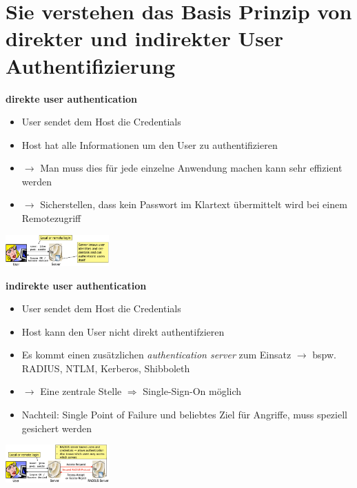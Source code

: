 \documentclass{report}
\newenvironment{Figure}
	{\par\medskip\noindent\minipage{\linewidth}}
	{\endminipage\par\medskip}
\theoremstyle{definition}
\theoremstyle{example}
\begin{document}
\section{Sie verstehen das Basis Prinzip von direkter und indirekter User Authentifizierung}
\textbf{direkte user authentication}
\begin{itemize}
	\item User sendet dem Host die Credentials
	\item Host hat alle Informationen um den User zu authentifizieren
	\item $\rightarrow$ Man muss dies für jede einzelne Anwendung machen kann sehr effizient werden
	\item $\rightarrow$ Sicherstellen, dass kein Passwort im Klartext übermittelt wird bei einem Remotezugriff
\end{itemize}

\begin{Figure}
\centering
\includegraphics[width=150px]{img/directUserAuthentication.png}
	\label{fig:Abbildung der Terminologien}
\end{Figure}

\textbf{indirekte user authentication}
\begin{itemize}
	\item User sendet dem Host die Credentials
	\item Host kann den User nicht direkt authentifzieren
	\item Es kommt einen zusätzlichen \textit{authentication server} zum Einsatz $\rightarrow$ bspw. RADIUS, NTLM, Kerberos, Shibboleth
	\item $\rightarrow$ Eine zentrale Stelle $\Rightarrow$ Single-Sign-On möglich
	\item Nachteil: Single Point of Failure und beliebtes Ziel für Angriffe, muss speziell gesichert werden
\end{itemize}

\begin{Figure}
\centering
\includegraphics[width=150px]{img/indirectUserAuthentication.png}
	\label{fig:Abbildung der Terminologien}
\end{Figure}
\end{document}

